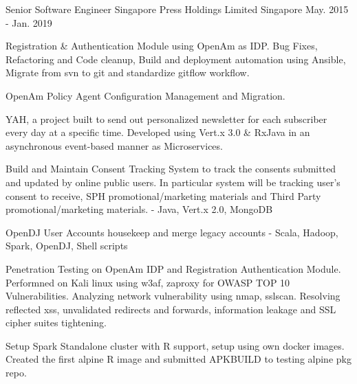 \begin{cventries}
  \cventry
      {Senior Software Engineer} %
      {Singapore Press Holdings Limited} %
      {Singapore} %
      {May. 2015 - Jan. 2019} %
      { %
        \begin{cvitems}
          \item {Registration \& Authentication Module using OpenAm as IDP. Bug Fixes, Refactoring and Code cleanup, Build and deployment automation using Ansible, Migrate from svn to git and standardize gitflow workflow.}
          \item {OpenAm Policy Agent Configuration Management and Migration.}
          \item {YAH, a project built to send out personalized newsletter for each subscriber every day at a specific time. Developed using Vert.x 3.0 \& RxJava in an asynchronous event-based manner as Microservices.}
          \item {Build and Maintain Consent Tracking System to track the consents submitted and updated by online public users. In particular system will be tracking user’s consent to receive, SPH promotional/marketing materials and Third Party promotional/marketing materials. - Java, Vert.x 2.0, MongoDB}
          \item {OpenDJ User Accounts housekeep and merge legacy accounts - Scala, Hadoop, Spark, OpenDJ, Shell scripts }
          \item {Penetration Testing on OpenAm IDP and Registration Authentication Module. Performned on Kali linux using w3af, zaproxy for OWASP TOP 10 Vulnerabilities. Analyzing network vulnerability using nmap, sslscan.  Resolving reflected xss, unvalidated redirects and forwards, information leakage and SSL cipher suites tightening.}
          \item {Setup Spark Standalone cluster with R support, setup using own docker images. Created the first alpine R image and submitted APKBUILD to testing alpine pkg repo.}
        \end{cvitems}
      }



\end{cventries}
